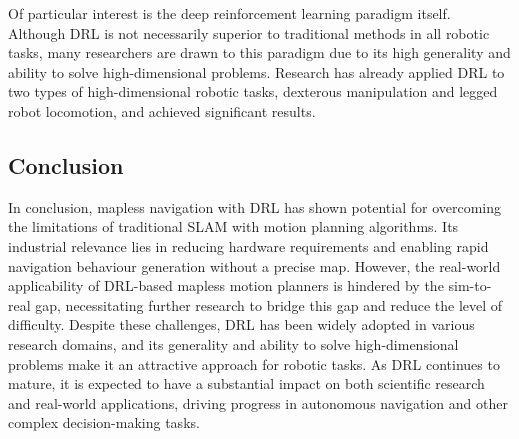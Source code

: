 Of particular interest is the deep reinforcement learning paradigm itself. Although DRL is not necessarily superior to traditional methods in all robotic tasks, many researchers are drawn to this paradigm due to its high generality and ability to solve high-dimensional problems. Research has already applied DRL to two types of high-dimensional robotic tasks, dexterous manipulation and legged robot locomotion, and achieved significant results.

\subsection{Conclusion}

In conclusion, mapless navigation with DRL has shown potential for overcoming the limitations of traditional SLAM with motion planning algorithms. Its industrial relevance lies in reducing hardware requirements and enabling rapid navigation behaviour generation without a precise map. However, the real-world applicability of DRL-based mapless motion planners is hindered by the sim-to-real gap, necessitating further research to bridge this gap and reduce the level of difficulty. Despite these challenges, DRL has been widely adopted in various research domains, and its generality and ability to solve high-dimensional problems make it an attractive approach for robotic tasks. As DRL continues to mature, it is expected to have a substantial impact on both scientific research and real-world applications, driving progress in autonomous navigation and other complex decision-making tasks.
